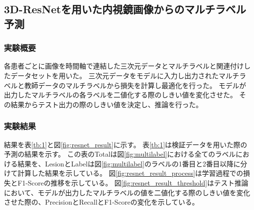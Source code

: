 \subsection{3D-ResNetを用いた内視鏡画像からのマルチラベル予測}
\subsubsection{実験概要}
各患者ごとに画像を時間軸で連結した三次元データとマルチラベルと関連付けしたデータセットを用いた。
三次元データをモデルに入力し出力されたマルチラベルと教師データのマルチラベルから損失を計算し最適化を行った。
モデルが出力したマルチラベルの各ラベルを二値化する際のしきい値を変化させた。
その結果からテスト出力の際のしきい値を決定し、推論を行った。

\subsubsection{実験結果}
結果を表\ref{tb:1}と図\ref{fig:resnet_result}に示す。
表\ref{tb:1}は検証データを用いた際の予測の結果を示す。
この表のTotalは図\ref{fig:multilabel}における全てのラベルにおける結果を、LesionとLabelは図\ref{fig:multilabel}のラベルの1番目と2番目以降に分けて計算した結果を示している。
図\ref{fig:resnet_result_process}は学習過程での損失とF1-Scoreの推移を示している。
図\ref{fig:resnet_result_threshold}はテスト推論において、モデルが出力したマルチラベルの値を二値化する際のしきい値を変化させた際の、PrecisionとRecallとF1-Scoreの変化を示している。

